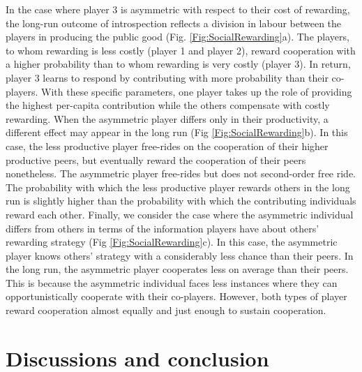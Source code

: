 \documentclass[11pt]{article}
\theoremstyle{plainCl1}
\theoremstyle{plainCl2}
\begin{document}
\noindent In the case where player 3 is asymmetric with respect to their cost of rewarding, the long-run outcome of introspection reflects a division in labour between the players in producing the public good (Fig. \ref{Fig:SocialRewarding}a). The players, to whom rewarding is less costly (player 1 and player 2), reward cooperation with a higher probability than to whom rewarding is very costly (player 3). In return, player 3 learns to respond by contributing with more probability than their co-players. With these specific parameters, one player takes up the role of providing the highest per-capita contribution while the others compensate with costly rewarding. When the asymmetric player differs only in their productivity, a different effect may appear in the long run (Fig \ref{Fig:SocialRewarding}b). In this case, the less productive player free-rides on the cooperation of their higher productive peers, but eventually reward the cooperation of their peers nonetheless. The asymmetric player free-rides but does not second-order free ride. The probability with which the less productive player rewards others in the long run is slightly higher than the probability with which the contributing individuals reward each other. Finally, we consider the case where the asymmetric individual differs from others in terms of the information players have about others' rewarding strategy (Fig \ref{Fig:SocialRewarding}c). In this case, the asymmetric player knows others' strategy with a considerably less chance than their peers. In the long run, the asymmetric player cooperates less on average than their peers. This is because the asymmetric individual faces less instances where they can opportunistically cooperate with their co-players. However, both types of player reward cooperation almost equally and just enough to sustain cooperation. 

\section*{Discussions and conclusion}

\end{document}
